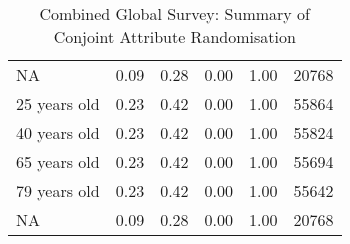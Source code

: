 \begin{sidewaystable}[ht]
\begin{tabular}{lrrrrl}
  NA & 0.09 & 0.28 & 0.00 & 1.00 & 20768 \\ 
  25 years old & 0.23 & 0.42 & 0.00 & 1.00 & 55864 \\ 
  40 years old & 0.23 & 0.42 & 0.00 & 1.00 & 55824 \\ 
  65 years old & 0.23 & 0.42 & 0.00 & 1.00 & 55694 \\ 
  79 years old & 0.23 & 0.42 & 0.00 & 1.00 & 55642 \\ 
  NA & 0.09 & 0.28 & 0.00 & 1.00 & 20768 \\ 
   \hline
\end{tabular}
\caption{Combined Global Survey: Summary of Conjoint Attribute Randomisation} 
\label{tab:randomisation}
\end{sidewaystable}
